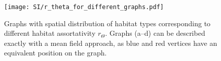 




\begin{figure}[t]
  \centerline{
      \texttt{[image: SI/r\_theta\_for\_different\_graphs.pdf]} 
  }
  \caption{Graphs with spatial distribution of habitat types corresponding to different habitat assortativity $r_\Theta$. Graphs (a–d) can be described exactly with a mean field approach, as blue and red vertices have an equivalent position on the graph.}
  \label{figSI:graph_rtheta}
\end{figure}
\FloatBarrier


